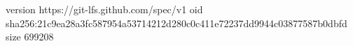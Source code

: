 version https://git-lfs.github.com/spec/v1
oid sha256:21c9ea28a3fc587954a53714212d280c0c411e72237dd9944c03877587b0dbfd
size 699208
